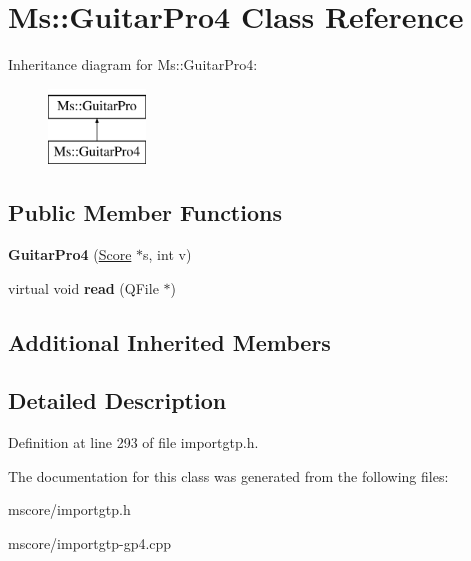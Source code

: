 \hypertarget{class_ms_1_1_guitar_pro4}{}\section{Ms\+:\+:Guitar\+Pro4 Class Reference}
\label{class_ms_1_1_guitar_pro4}
Inheritance diagram for Ms\+:\+:Guitar\+Pro4\+:\begin{figure}[H]
\begin{center}
\leavevmode
\includegraphics[height=2.000000cm]{class_ms_1_1_guitar_pro4}
\end{center}
\end{figure}
\subsection*{Public Member Functions}
\begin{DoxyCompactItemize}
\item 
\mbox{\label{class_ms_1_1_guitar_pro4_a2d48bdb81a11ee8cbf0d4f699dc90b11}} 
{\bfseries Guitar\+Pro4} (\hyperlink{class_ms_1_1_score}{Score} $\ast$s, int v)
\item 
\mbox{\label{class_ms_1_1_guitar_pro4_a1e41b5a5ea8a3878cd8b4b4e12e315c4}} 
virtual void {\bfseries read} (Q\+File $\ast$)
\end{DoxyCompactItemize}
\subsection*{Additional Inherited Members}


\subsection{Detailed Description}


Definition at line 293 of file importgtp.\+h.



The documentation for this class was generated from the following files\+:\begin{DoxyCompactItemize}
\item 
mscore/importgtp.\+h\item 
mscore/importgtp-\/gp4.\+cpp\end{DoxyCompactItemize}

